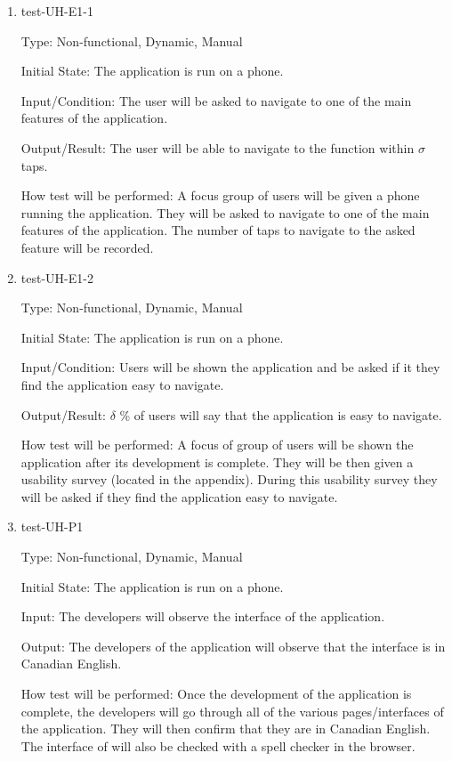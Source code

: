 \documentclass[12pt, titlepage]{article}
\begin{document}
\begin{enumerate}

\item{test-UH-E1-1\\}

Type: Non-functional, Dynamic, Manual
					
Initial State: The application is run on a phone.
					
Input/Condition: The user will be asked to navigate to one of the main features of the application.
					
Output/Result: The user will be able to navigate to the function within $\sigma$ taps.
					
How test will be performed: A focus group of users will be given a phone running the application. They  will be asked to navigate to one of the main features of the application. The number of taps to navigate to the asked feature will be recorded. 

\item{test-UH-E1-2\\}

Type: Non-functional, Dynamic, Manual 
					
Initial State: The application is run on a phone.
					
Input/Condition: Users will be shown the application and be asked if it they find the application easy to navigate. 
					
Output/Result: $\delta$ \% of users will say that the application is easy to navigate. 
					
How test will be performed: A focus of group of users will be shown the application after its development is complete. They will be then given a usability survey (located in the appendix). During this usability survey they will be asked if they find the application easy to navigate.
					
\item{test-UH-P1\\}

Type: Non-functional, Dynamic, Manual
					
Initial State: The application is run on a phone.
					
Input: The developers will observe the interface of the application.
					
Output: The developers of the application will observe that the interface is in Canadian English.
					
How test will be performed: Once the development of the application is complete, the developers will go through all of the various pages/interfaces of the application. They will then confirm that they are in Canadian English. The interface of \progname{} will also be checked with a spell checker in the browser.


\end{enumerate}
\end{document}
